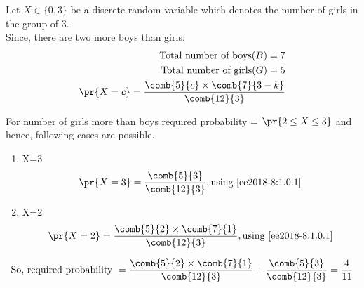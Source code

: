 

Let $X \in \{0,3\}$ be a discrete random variable which denotes the number of girls in the group of 3.\\ 
Since, there are two more boys than girls:\\
\begin{align}
    \text{Total number of boys} (B) = 7  \notag \\
    \text{Total number of girls} (G) = 5  \notag\\
    \pr{X=c}=\frac{\comb{5}{c}\times \comb{7}{3-k}}{\comb{12}{3}} \label{ee2018-8:1.0.1}
\end{align}


For number of girls more than boys required probability = $ \pr{2\le X \le 3}$ and hence, following cases are possible. 
\begin{enumerate}
    \item X=3
    \begin{align}
        \pr{X=3} = \frac{\comb{5}{3}}{\comb{12}{3}}, \text{using \eqref{ee2018-8:1.0.1}} \notag
    \end{align}
    \item X=2
    \begin{align}
        \pr{X=2} = \frac{\comb{5}{2}\times\comb{7}{1}}{\comb{12}{3}}, \text{using \eqref{ee2018-8:1.0.1}} \notag
    \end{align}
\end{enumerate}
\begin{align}
   \text {So, required probability }=  \frac{\comb{5}{2}\times\comb{7}{1}}{\comb{12}{3}} + \frac{\comb{5}{3}}{\comb{12}{3}} = \frac{4}{11} \notag
\end{align}

